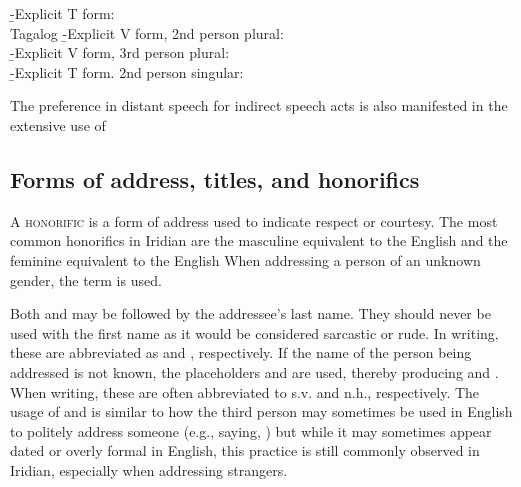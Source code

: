 			\b{-}{Explicit T form:\\
				 }
		\endsubsub
	\a Tagalog
		\beginsubsub
			\b{-}{Explicit V form, 2nd person plural:\\
				 }
			\b{-}{Explicit V form, 3rd person plural:\\
				 }
			\b{-}{Explicit T form. 2nd person singular:\\
				 }
		\endsubsub
\xe

The preference in distant speech for indirect speech acts is also manifested in
the extensive use of 

\subsection{Forms of address, titles, and honorifics}

A {\scshape honorific} is a form of address used to indicate respect or
courtesy. The most common honorifics in Iridian are the masculine 
equivalent to the English  and the feminine 
equivalent to the English  When addressing a person of an
unknown gender, the term  is used.

Both  and  may be followed by the addressee's last name. They
should never be used with the first name as it would be considered sarcastic or
rude. In writing, these are abbreviated as  and , respectively.
If the name of the person being addressed is not known, the placeholders
 and  are used, thereby producing  and . When writing, these are often abbreviated to {\sc
s.v.} and {\sc n.h.}, respectively. The usage of  and  is similar to how the third person may sometimes be used in
English to politely address someone (e.g., saying, ) but while it may sometimes appear dated or overly formal in
English, this practice is still commonly observed in Iridian,
especially when addressing strangers.

